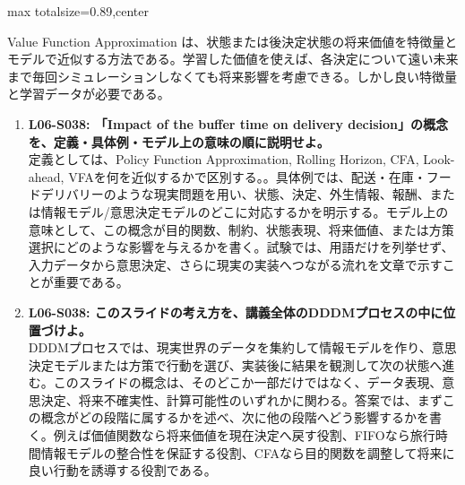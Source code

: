 \begin{minipage}[t]{0.58\textwidth}
\begin{adjustbox}{max totalsize={\textwidth}{0.89\textheight},center}
\begin{minipage}{\textwidth}
Value Function Approximation は、状態または後決定状態の将来価値を特徴量とモデルで近似する方法である。学習した価値を使えば、各決定について遠い未来まで毎回シミュレーションしなくても将来影響を考慮できる。しかし良い特徴量と学習データが必要である。\par{}\begin{enumerate}\item \textbf{L06-S038: 「Impact of the buffer time on delivery decision」の概念を、定義・具体例・モデル上の意味の順に説明せよ。}\\定義としては、Policy Function Approximation, Rolling Horizon, CFA, Look-ahead, VFAを何を近似するかで区別する。。具体例では、配送・在庫・フードデリバリーのような現実問題を用い、状態、決定、外生情報、報酬、または情報モデル/意思決定モデルのどこに対応するかを明示する。モデル上の意味として、この概念が目的関数、制約、状態表現、将来価値、または方策選択にどのような影響を与えるかを書く。試験では、用語だけを列挙せず、入力データから意思決定、さらに現実の実装へつながる流れを文章で示すことが重要である。\item \textbf{L06-S038: このスライドの考え方を、講義全体のDDDMプロセスの中に位置づけよ。}\\DDDMプロセスでは、現実世界のデータを集約して情報モデルを作り、意思決定モデルまたは方策で行動を選び、実装後に結果を観測して次の状態へ進む。このスライドの概念は、そのどこか一部だけではなく、データ表現、意思決定、将来不確実性、計算可能性のいずれかに関わる。答案では、まずこの概念がどの段階に属するかを述べ、次に他の段階へどう影響するかを書く。例えば価値関数なら将来価値を現在決定へ戻す役割、FIFOなら旅行時間情報モデルの整合性を保証する役割、CFAなら目的関数を調整して将来に良い行動を誘導する役割である。\end{enumerate}
\end{minipage}
\end{adjustbox}
\end{minipage}



